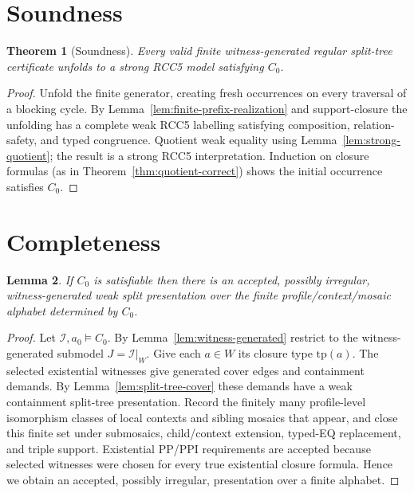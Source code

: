 \documentclass[11pt]{article}
\newcommand{\tp}{\mathrm{tp}}
\newtheorem{theorem}{Theorem}[section]
\newtheorem{lemma}[theorem]{Lemma}
\begin{document}
\section{Soundness}
\label{sec:soundness}

\begin{theorem}[Soundness]
Every valid finite witness-generated regular split-tree certificate unfolds to a
strong RCC5 model satisfying $C_0$.
\end{theorem}

\begin{proof}
Unfold the finite generator, creating fresh occurrences on every traversal of
a blocking cycle. By Lemma~\ref{lem:finite-prefix-realization} and support-closure the
unfolding has a complete weak RCC5 labelling satisfying composition,
relation-safety, and typed congruence. Quotient weak equality using
Lemma~\ref{lem:strong-quotient}; the result is a strong RCC5 interpretation.
Induction on closure formulas (as in Theorem~\ref{thm:quotient-correct})
shows the initial occurrence satisfies $C_0$.
\end{proof}

\section{Completeness}
\label{sec:completeness}

\begin{lemma}
\label{lem:accepted-presentation}
If $C_0$ is satisfiable then there is an accepted, possibly irregular,
witness-generated weak split presentation over the finite profile/context/mosaic
alphabet determined by $C_0$.
\end{lemma}

\begin{proof}
Let $\mathcal{I},a_0\models C_0$. By Lemma~\ref{lem:witness-generated} restrict
to the witness-generated submodel $J=\mathcal{I}|_W$. Give each $a\in W$ its
closure type $\tp(a)$. The selected existential witnesses give generated cover
edges and containment demands. By Lemma~\ref{lem:split-tree-cover} these
demands have a weak containment split-tree presentation. Record the finitely
many profile-level isomorphism classes of local contexts and sibling mosaics
that appear, and close this finite set under submosaics, child/context
extension, typed-EQ replacement, and triple support. Existential PP/PPI
requirements are accepted because selected witnesses were chosen for every
true existential closure formula. Hence we obtain an accepted, possibly
irregular, presentation over a finite alphabet.
\end{proof}
\end{document}
